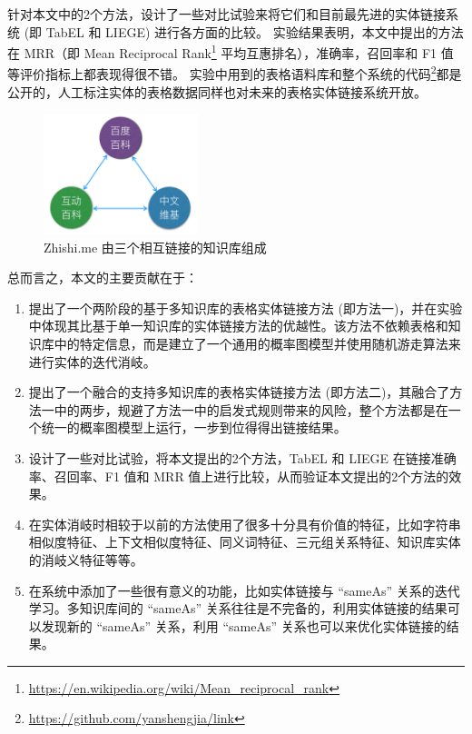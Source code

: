 针对本文中的2个方法，设计了一些对比试验来将它们和目前最先进的实体链接系统 (即 TabEL\cite{bhagavatula2015tabel} 和 LIEGE\cite{shen2012liege}) 进行各方面的比较。
实验结果表明，本文中提出的方法在 MRR（即 Mean Reciprocal Rank\footnote{\url{https://en.wikipedia.org/wiki/Mean_reciprocal_rank}} 平均互惠排名），准确率，召回率和 F1 值等评价指标上都表现得很不错。
实验中用到的表格语料库和整个系统的代码\footnote{\url{https://github.com/yanshengjia/link}}都是公开的，人工标注实体的表格数据同样也对未来的表格实体链接系统开放。\par

\begin{figure}[htbp]
\centering
\includegraphics[width=0.4\textwidth]{img/zhishime_link}
\caption{Zhishi.me 由三个相互链接的知识库组成}
\label{zhishime_link}
\end{figure}

总而言之，本文的主要贡献在于：
\begin{enumerate}[1.]
  \item 提出了一个两阶段的基于多知识库的表格实体链接方法 (即方法一)，并在实验中体现其比基于单一知识库的实体链接方法的优越性。该方法不依赖表格和知识库中的特定信息，而是建立了一个通用的概率图模型并使用随机游走算法来进行实体的迭代消岐。
  \item 提出了一个融合的支持多知识库的表格实体链接方法 (即方法二)，其融合了方法一中的两步，规避了方法一中的启发式规则带来的风险，整个方法都是在一个统一的概率图模型上运行，一步到位得得出链接结果。
  \item 设计了一些对比试验，将本文提出的2个方法，TabEL\cite{bhagavatula2015tabel} 和 LIEGE\cite{shen2012liege} 在链接准确率、召回率、F1 值和 MRR 值上进行比较，从而验证本文提出的2个方法的效果。
  \item 在实体消岐时相较于以前的方法使用了很多十分具有价值的特征，比如字符串相似度特征、上下文相似度特征、同义词特征、三元组关系特征、知识库实体的消岐义特征等等。
  \item 在系统中添加了一些很有意义的功能，比如实体链接与 ``sameAs'' 关系的迭代学习。多知识库间的 ``sameAs'' 关系往往是不完备的，利用实体链接的结果可以发现新的 ``sameAs'' 关系，利用 ``sameAs'' 关系也可以来优化实体链接的结果。
\end{enumerate}

